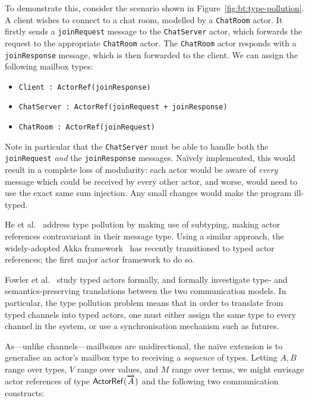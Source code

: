 \documentclass[
graybox,
envcountchap
]{svmult}
\begin{document}
\begin{bibunit}
  To demonstrate this,
  consider the scenario shown in Figure~\ref{fig:bt:type-pollution}. A client
  wishes to connect to a chat room, modelled by a \lstinline+ChatRoom+ actor. It
  firstly sends a \lstinline+joinRequest+ message to the \lstinline+ChatServer+
  actor, which forwards the request to the appropriate \lstinline+ChatRoom+
  actor. The \lstinline+ChatRoom+ actor responds with a \lstinline+joinResponse+
  message, which is then forwarded to the client. We can assign the following
  mailbox types:


  \begin{itemize}
    \item \lstinline|Client : ActorRef(joinResponse)|
    \item \lstinline|ChatServer : ActorRef(joinRequest + joinResponse)|
    \item \lstinline|ChatRoom : ActorRef(joinRequest)|
  \end{itemize}

  Note in particular that the \lstinline+ChatServer+ must be able to handle both
  the \lstinline+joinRequest+ \emph{and} the \lstinline+joinResponse+ messages.
  Na\"ively implemented, this would result in a complete loss of modularity:
  each actor would be aware of \emph{every} message which could be received by
  every other actor, and worse, would need to use the exact same sum injection.
  Any small changes would make the program ill-typed.

  He et al.~\cite{HeWT14:actors} address type pollution by making use of subtyping, making
  actor references contravariant in their message type. Using a similar
  approach, the widely-adopted Akka framework~\cite{akka} has recently
  transitioned to typed actor references; the first major actor framework to do so.

  Fowler et al.~\cite{FowlerLW17:mm} study typed actors formally, and formally investigate
  type- and semantics-preserving translations between the two communication
  models. In particular, the type pollution problem means that in order to
  translate from typed channels into typed actors, one must either assign the
  same type to every channel in the system, or use a synchronisation mechanism
  such as futures.

  As---unlike channels---mailboxes are unidirectional, the na\"ive extension is
  to generalise an actor's mailbox type to receiving a \emph{sequence} of types.
  Letting $A, B$ range over types, $V$ range over values, and $M$ range over
  terms, we might envisage actor references of type $\mathsf{ActorRef}(\overrightarrow{A})$ and the
  following two communication constructs:


\end{bibunit}
\end{document}
